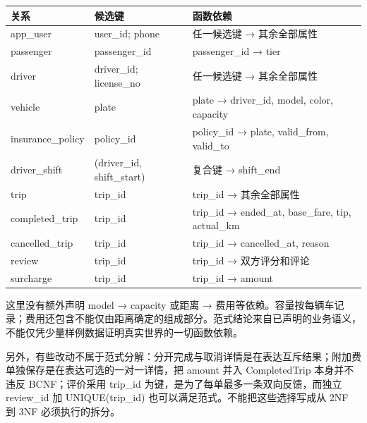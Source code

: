 \documentclass[11pt,a4paper]{article}
\begin{document}
\par\begingroup\small\noindent
\begin{tabularx}{\linewidth}{p{3.0cm}p{4.0cm}X}
\toprule
关系 & 候选键 & 函数依赖\\\midrule
app\_\allowbreak{}user & user\_\allowbreak{}id; phone & 任一候选键 → 其余全部属性\\
passenger & passenger\_\allowbreak{}id & passenger\_\allowbreak{}id → tier\\
driver & driver\_\allowbreak{}id; license\_\allowbreak{}no & 任一候选键 → 其余全部属性\\
vehicle & plate & plate → driver\_\allowbreak{}id, model, color, capacity\\
insurance\_\allowbreak{}policy & policy\_\allowbreak{}id & policy\_\allowbreak{}id → plate, valid\_\allowbreak{}from, valid\_\allowbreak{}to\\
driver\_\allowbreak{}shift & (driver\_\allowbreak{}id, shift\_\allowbreak{}start) & 复合键 → shift\_\allowbreak{}end\\
trip & trip\_\allowbreak{}id & trip\_\allowbreak{}id → 其余全部属性\\
completed\_\allowbreak{}trip & trip\_\allowbreak{}id & trip\_\allowbreak{}id → ended\_\allowbreak{}at, base\_\allowbreak{}fare, tip, actual\_\allowbreak{}km\\
cancelled\_\allowbreak{}trip & trip\_\allowbreak{}id & trip\_\allowbreak{}id → cancelled\_\allowbreak{}at, reason\\
review & trip\_\allowbreak{}id & trip\_\allowbreak{}id → 双方评分和评论\\
surcharge & trip\_\allowbreak{}id & trip\_\allowbreak{}id → amount\\
\bottomrule
\end{tabularx}
\par\endgroup

这里没有额外声明 model → capacity 或距离 → 费用等依赖。容量按每辆车记录；费用还包含不能仅由距离确定的组成部分。范式结论来自已声明的业务语义，不能仅凭少量样例数据证明真实世界的一切函数依赖。

另外，有些改动不属于范式分解：分开完成与取消详情是在表达互斥结果；附加费单独保存是在表达可选的一对一详情，把 amount 并入 CompletedTrip 本身并不违反 BCNF；评价采用 trip\_\allowbreak{}id 为键，是为了每单最多一条双向反馈，而独立 review\_\allowbreak{}id 加 UNIQUE(trip\_\allowbreak{}id) 也可以满足范式。不能把这些选择写成从 2NF 到 3NF 必须执行的拆分。
\end{document}
